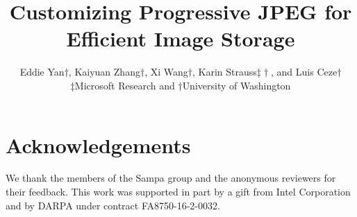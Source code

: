 \documentclass[letterpaper,twocolumn,10pt]{article}
\begin{document}
\date{}

\title{\Large \bf Customizing Progressive JPEG for Efficient Image Storage}

\author{
{\rm Eddie Yan$\dagger$, Kaiyuan Zhang$\dagger$, Xi Wang$\dagger$, Karin Strauss$\ddagger\dagger$, and Luis Ceze$\dagger$}\\
$\ddagger$Microsoft Research and $\dagger$University of Washington
} %

\maketitle

\thispagestyle{empty}





















\section*{Acknowledgements}

We thank the members of the Sampa group and the anonymous reviewers for their feedback. This work was supported in part by a gift from Intel Corporation and by DARPA under contract FA8750-16-2-0032.

{\footnotesize 
}

\end{document}
